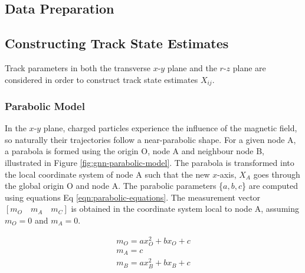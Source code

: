 \subsection{Data Preparation}



\subsection{Constructing Track State Estimates}
\label{constructing-track-states}

Track parameters in both the transverse $x$-$y$ plane and the $r$-$z$ plane are considered in order to construct track state estimates $X_{ij}$.


\subsubsection{Parabolic Model}
\label{parabolic-state}

In the $x$-$y$ plane, charged particles experience the influence of the magnetic field, so naturally their trajectories follow a near-parabolic shape. For a given node A, a parabola is formed using the origin O, node A and neighbour node B, illustrated in Figure \ref{fig:gnn-parabolic-model}. The parabola is transformed into the local coordinate system of node A such that the new $x$-axis, $X_A$ goes through the global origin O and node A. The parabolic parameters \{$a, b, c$\} are computed using equations Eq \eqref{eqn:parabolic-equations}. The measurement vector $[m_O \quad m_A \quad m_C]$ is obtained in the coordinate system local to node A, assuming $m_O = 0$ and $m_A = 0$.

\begin{equation}
\begin{aligned}
m_O = ax_{O}^{2} + bx_O + c \\
m_A = c \\
m_B = ax_{B}^{2} + bx_B + c
\end{aligned}
\label{eqn:parabolic-equations}
\end{equation}

